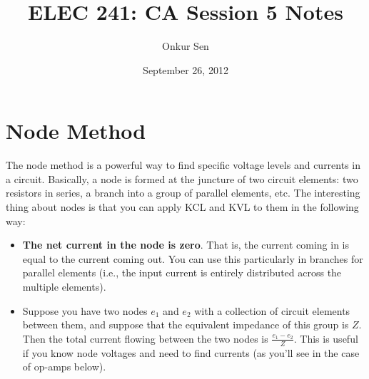 \documentclass[11pt]{article}
\title{ELEC 241: CA Session 5 Notes}
\author{Onkur Sen}
\date{September 26, 2012}
\begin{document}
\maketitle

\section*{Node Method}

The node method is a powerful way to find specific voltage levels and currents in a circuit. Basically, a node is formed at the juncture of two circuit elements: two resistors in series, a branch into a group of parallel elements, etc. The interesting thing about nodes is that you can apply KCL and KVL to them in the following way:

\begin{itemize}
\item {\bf The net current in the node is zero}. That is, the current coming in is equal to the current coming out. You can use this particularly in branches for parallel elements (i.e., the input current is entirely distributed across the multiple elements).
\item Suppose you have two nodes $e_1$ and $e_2$ with a collection of circuit elements between them, and suppose that the equivalent impedance of this group is $Z$. Then the total current flowing between the two nodes is $\frac{e_1-e_2}{Z}$. This is useful if you know node voltages and need to find currents (as you'll see in the case of op-amps below).
\end{itemize} 
\end{document}
